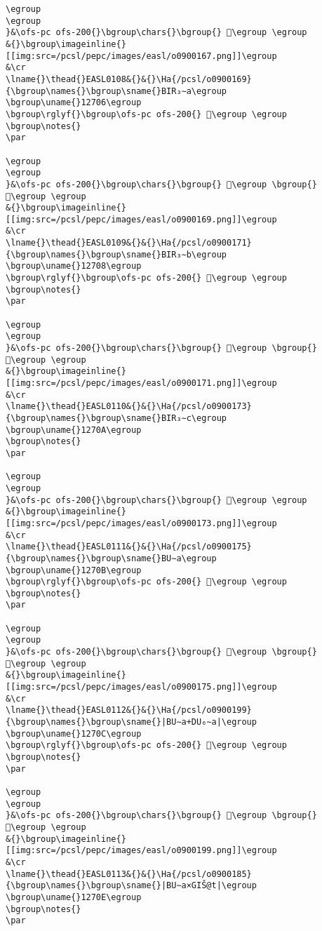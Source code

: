 \begin{verbatim}
\egroup
\egroup
}&\ofs-pc ofs-200{}\bgroup\chars{}\bgroup{} 𒜅\egroup \egroup
&{}\bgroup\imageinline{}[[img:src=/pcsl/pepc/images/easl/o0900167.png]]\egroup
&\cr
\lname{}\thead{}EASL0108&{}&{}\Ha{/pcsl/o0900169}{\bgroup\names{}\bgroup\sname{}BIR₃∼a\egroup
\bgroup\uname{}12706\egroup
\bgroup\rglyf{}\bgroup\ofs-pc ofs-200{} 𒜆\egroup \egroup
\bgroup\notes{}
\par 

\egroup
\egroup
}&\ofs-pc ofs-200{}\bgroup\chars{}\bgroup{} 𒜇\egroup \bgroup{} 𒜆\egroup \egroup
&{}\bgroup\imageinline{}[[img:src=/pcsl/pepc/images/easl/o0900169.png]]\egroup
&\cr
\lname{}\thead{}EASL0109&{}&{}\Ha{/pcsl/o0900171}{\bgroup\names{}\bgroup\sname{}BIR₃∼b\egroup
\bgroup\uname{}12708\egroup
\bgroup\rglyf{}\bgroup\ofs-pc ofs-200{} 𒜈\egroup \egroup
\bgroup\notes{}
\par 

\egroup
\egroup
}&\ofs-pc ofs-200{}\bgroup\chars{}\bgroup{} 𒜉\egroup \bgroup{} 𒜈\egroup \egroup
&{}\bgroup\imageinline{}[[img:src=/pcsl/pepc/images/easl/o0900171.png]]\egroup
&\cr
\lname{}\thead{}EASL0110&{}&{}\Ha{/pcsl/o0900173}{\bgroup\names{}\bgroup\sname{}BIR₃∼c\egroup
\bgroup\uname{}1270A\egroup
\bgroup\notes{}
\par 

\egroup
\egroup
}&\ofs-pc ofs-200{}\bgroup\chars{}\bgroup{} 𒜊\egroup \egroup
&{}\bgroup\imageinline{}[[img:src=/pcsl/pepc/images/easl/o0900173.png]]\egroup
&\cr
\lname{}\thead{}EASL0111&{}&{}\Ha{/pcsl/o0900175}{\bgroup\names{}\bgroup\sname{}BU∼a\egroup
\bgroup\uname{}1270B\egroup
\bgroup\rglyf{}\bgroup\ofs-pc ofs-200{} 𒜋\egroup \egroup
\bgroup\notes{}
\par 

\egroup
\egroup
}&\ofs-pc ofs-200{}\bgroup\chars{}\bgroup{} 𒜓\egroup \bgroup{} 𒜋\egroup \egroup
&{}\bgroup\imageinline{}[[img:src=/pcsl/pepc/images/easl/o0900175.png]]\egroup
&\cr
\lname{}\thead{}EASL0112&{}&{}\Ha{/pcsl/o0900199}{\bgroup\names{}\bgroup\sname{}|BU∼a+DU₆∼a|\egroup
\bgroup\uname{}1270C\egroup
\bgroup\rglyf{}\bgroup\ofs-pc ofs-200{} 𒜌\egroup \egroup
\bgroup\notes{}
\par 

\egroup
\egroup
}&\ofs-pc ofs-200{}\bgroup\chars{}\bgroup{} 𒜌\egroup \bgroup{} 𒜍\egroup \egroup
&{}\bgroup\imageinline{}[[img:src=/pcsl/pepc/images/easl/o0900199.png]]\egroup
&\cr
\lname{}\thead{}EASL0113&{}&{}\Ha{/pcsl/o0900185}{\bgroup\names{}\bgroup\sname{}|BU∼a×GIŠ@t|\egroup
\bgroup\uname{}1270E\egroup
\bgroup\notes{}
\par 


\end{verbatim}
